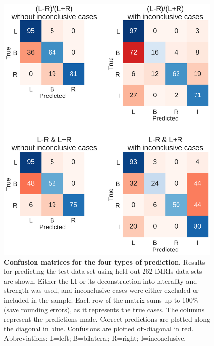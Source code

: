 \documentclass[fleqn,10pt]{SelfArx} %
\begin{document}
\begin{figure}[!htb]	
	\renewcommand{\familydefault}{\sfdefault}\normalfont
	\centering
	\includegraphics[width=\columnwidth]{../reports/figures/10-test-set-cms.png}
	\vspace*{-3mm}
	\caption{\textbf{Confusion matrices for the four types of prediction.}  Results for predicting the test data set using held-out 262 fMRIs data sets are shown. Either the LI or its deconstruction into laterality and strength was used, and inconclusive cases were either excluded or included in the sample. Each row of the matrix sums up to 100\% (save rounding errors), as it represents the true cases. The columns represent the predictions made. Correct predictions are plotted along the diagonal in blue. Confusions are plotted off-diagonal in red. Abbreviations: L=left; B=bilateral; R=right; I=inconclusive.}%
	\label{fig:cms}
\end{figure}
\end{document}
